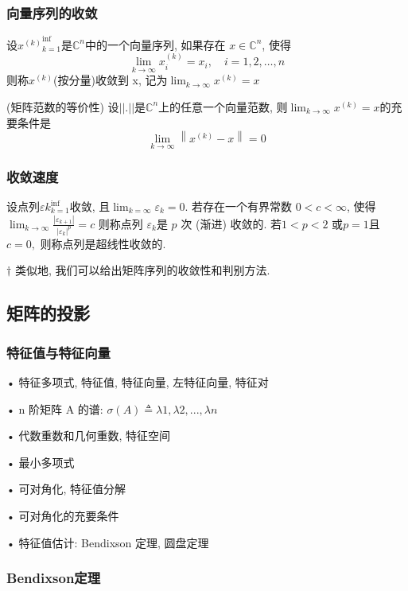 \documentclass[12pt,a4paper]{article}
\begin{document}
\subsubsection{向量序列的收敛}
设${x^{(k)}}^{\inf}_{
	k=1}$是$\mathbb{C}^n $中的一个向量序列, 如果存在 $x ∈ \mathbb{C}^n$, 使得
$$
\lim _{k \rightarrow \infty} x_{i}^{(k)}=x_{i}, \quad i=1,2, \ldots, n
$$
则称${x^{(k)}}$(按分量)收敛到 x, 记为$\lim _{k \rightarrow \infty} x^{(k)}=x$


\begin{theorem}(矩阵范数的等价性)
	设$||.||$是$\mathbb{C}^{n}$上的任意一个向量范数, 则$\lim _{k \rightarrow \infty} x^{(k)}=x$的充要条件是
	$$
	\lim _{k \rightarrow \infty}\left\|x^{(k)}-x\right\|=0
	$$
\end{theorem}


\subsubsection{收敛速度}
设点列${εk}_{k=1}^{\inf}$收敛, 且$\lim _{k=\infty} \varepsilon_{k}=0$. 若存在一个有界常数 $0 < c < ∞$, 使得
$\lim _{k \rightarrow \infty} \frac{\left|\varepsilon_{k+1}\right|}{\left|\varepsilon_{k}\right|^{p}}=c$
则称点列 ${ε_k} $是 $p$ 次 (渐进) 收敛的. 若$ 1 < p < 2$ 或$ p = 1 $且 $c = 0,$ 则称点列是超线性收敛的.


$†$ 类似地, 我们可以给出矩阵序列的收敛性和判别方法.


\subsection{矩阵的投影}
\subsubsection{特征值与特征向量}

• 特征多项式, 特征值, 特征向量, 左特征向量, 特征对

• n 阶矩阵 A 的谱: $σ(A) ≜ {λ1, λ2, . . . , λn}$

• 代数重数和几何重数, 特征空间

• 最小多项式

• 可对角化, 特征值分解

• 可对角化的充要条件

• 特征值估计: Bendixson 定理, 圆盘定理

\subsubsection{Bendixson定理}
\end{document}
